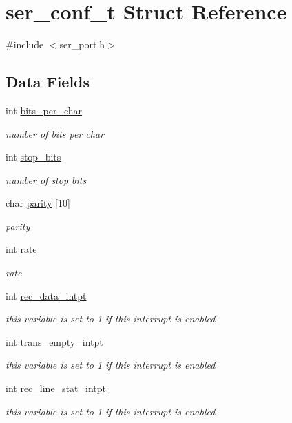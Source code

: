 \hypertarget{structser__conf__t}{}\section{ser\+\_\+conf\+\_\+t Struct Reference}
\label{structser__conf__t}


{\ttfamily \#include $<$ser\+\_\+port.\+h$>$}

\subsection*{Data Fields}
\begin{DoxyCompactItemize}
\item 
int \hyperlink{structser__conf__t_a542331bcc7806df403a7210e40382b89}{bits\+\_\+per\+\_\+char}
\begin{DoxyCompactList}\small\item\em number of bits per char \end{DoxyCompactList}\item 
int \hyperlink{structser__conf__t_a146991e1ecc6d049155a7a71739e9d0d}{stop\+\_\+bits}
\begin{DoxyCompactList}\small\item\em number of stop bits \end{DoxyCompactList}\item 
char \hyperlink{structser__conf__t_a0674046773a72bb7d71956cd58d393a9}{parity} \mbox{[}10\mbox{]}
\begin{DoxyCompactList}\small\item\em parity \end{DoxyCompactList}\item 
int \hyperlink{structser__conf__t_a7a829e6fd74e94e0edf10550470d844c}{rate}
\begin{DoxyCompactList}\small\item\em rate \end{DoxyCompactList}\item 
int \hyperlink{structser__conf__t_a98c7ee45de40e6a45659762a1fb66830}{rec\+\_\+data\+\_\+intpt}
\begin{DoxyCompactList}\small\item\em this variable is set to 1 if this interrupt is enabled \end{DoxyCompactList}\item 
int \hyperlink{structser__conf__t_ada0c84c6581ba1cfae8bd5e3ee17443a}{trans\+\_\+empty\+\_\+intpt}
\begin{DoxyCompactList}\small\item\em this variable is set to 1 if this interrupt is enabled \end{DoxyCompactList}\item 
int \hyperlink{structser__conf__t_a95598f55f1281cb9f1b46ee311fe793e}{rec\+\_\+line\+\_\+stat\+\_\+intpt}
\begin{DoxyCompactList}\small\item\em this variable is set to 1 if this interrupt is enabled \end{DoxyCompactList}\end{DoxyCompactItemize}


